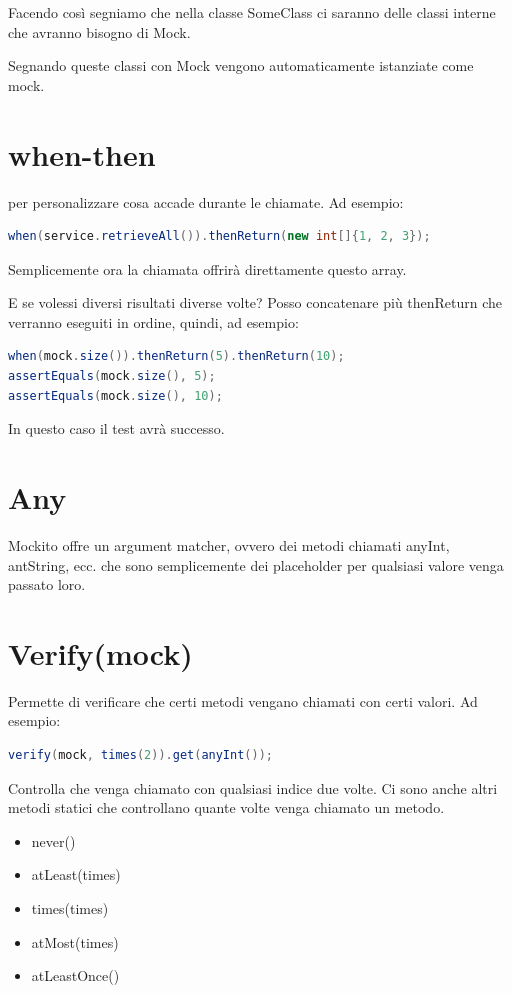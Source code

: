 \documentclass[11pt,a4paper]{book}
\begin{document}
Facendo così segniamo che nella classe SomeClass ci saranno delle classi interne che avranno bisogno di Mock.

Segnando queste classi con Mock vengono automaticamente istanziate come mock.

\section{when-then}\label{par: whenthen}
per personalizzare cosa accade durante le chiamate.
Ad esempio:
\begin{lstlisting}[language = Java]
when(service.retrieveAll()).thenReturn(new int[]{1, 2, 3});
\end{lstlisting}

Semplicemente ora la chiamata offrirà direttamente questo array.

E se volessi diversi risultati diverse volte? Posso concatenare più thenReturn che verranno eseguiti in ordine, quindi, ad esempio:
\begin{lstlisting}[language = Java]
when(mock.size()).thenReturn(5).thenReturn(10);
assertEquals(mock.size(), 5);
assertEquals(mock.size(), 10);
\end{lstlisting}

In questo caso il test avrà successo.

\section{Any}
Mockito offre un argument matcher, ovvero dei metodi chiamati anyInt, antString, ecc. che sono semplicemente dei placeholder per qualsiasi valore venga passato loro.

\section{Verify(mock)}
Permette di verificare che certi metodi vengano chiamati con certi valori.
Ad esempio:
\begin{lstlisting}[language = Java]
verify(mock, times(2)).get(anyInt());
\end{lstlisting}

Controlla che venga chiamato con qualsiasi indice due volte. Ci sono anche altri metodi statici che controllano quante volte venga chiamato un metodo.
\begin{itemize}
	\item never()
	\item atLeast(times)
	\item times(times)
	\item atMost(times)
	\item atLeastOnce()
\end{itemize}
\end{document}
